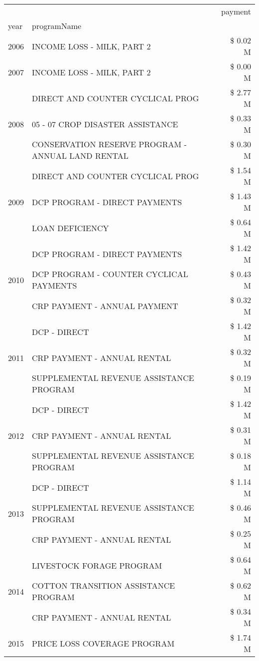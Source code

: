 \begin{tabular}{llr}
\toprule
 &  & payment \\
year & programName &  \\
\midrule
2006 & INCOME LOSS - MILK, PART 2 & \$ 0.02 M \\
\cline{1-3}
2007 & INCOME LOSS - MILK, PART 2 & \$ 0.00 M \\
\cline{1-3}
\multirow[t]{3}{*}{2008} & DIRECT AND COUNTER CYCLICAL PROG & \$ 2.77 M \\
 & 05 - 07 CROP DISASTER ASSISTANCE & \$ 0.33 M \\
 & CONSERVATION RESERVE PROGRAM - ANNUAL LAND RENTAL & \$ 0.30 M \\
\cline{1-3}
\multirow[t]{3}{*}{2009} & DIRECT AND COUNTER CYCLICAL PROG & \$ 1.54 M \\
 & DCP PROGRAM - DIRECT PAYMENTS & \$ 1.43 M \\
 & LOAN DEFICIENCY & \$ 0.64 M \\
\cline{1-3}
\multirow[t]{3}{*}{2010} & DCP PROGRAM - DIRECT PAYMENTS & \$ 1.42 M \\
 & DCP PROGRAM - COUNTER CYCLICAL PAYMENTS & \$ 0.43 M \\
 & CRP PAYMENT - ANNUAL PAYMENT & \$ 0.32 M \\
\cline{1-3}
\multirow[t]{3}{*}{2011} & DCP - DIRECT & \$ 1.42 M \\
 & CRP PAYMENT - ANNUAL RENTAL & \$ 0.32 M \\
 & SUPPLEMENTAL REVENUE ASSISTANCE PROGRAM & \$ 0.19 M \\
\cline{1-3}
\multirow[t]{3}{*}{2012} & DCP - DIRECT & \$ 1.42 M \\
 & CRP PAYMENT - ANNUAL RENTAL & \$ 0.31 M \\
 & SUPPLEMENTAL REVENUE ASSISTANCE PROGRAM & \$ 0.18 M \\
\cline{1-3}
\multirow[t]{3}{*}{2013} & DCP - DIRECT & \$ 1.14 M \\
 & SUPPLEMENTAL REVENUE ASSISTANCE PROGRAM & \$ 0.46 M \\
 & CRP PAYMENT - ANNUAL RENTAL & \$ 0.25 M \\
\cline{1-3}
\multirow[t]{3}{*}{2014} & LIVESTOCK FORAGE PROGRAM & \$ 0.64 M \\
 & COTTON TRANSITION ASSISTANCE PROGRAM & \$ 0.62 M \\
 & CRP PAYMENT - ANNUAL RENTAL & \$ 0.34 M \\
\cline{1-3}
\multirow[t]{3}{*}{2015} & PRICE LOSS COVERAGE PROGRAM & \$ 1.74 M \\

\end{tabular}
